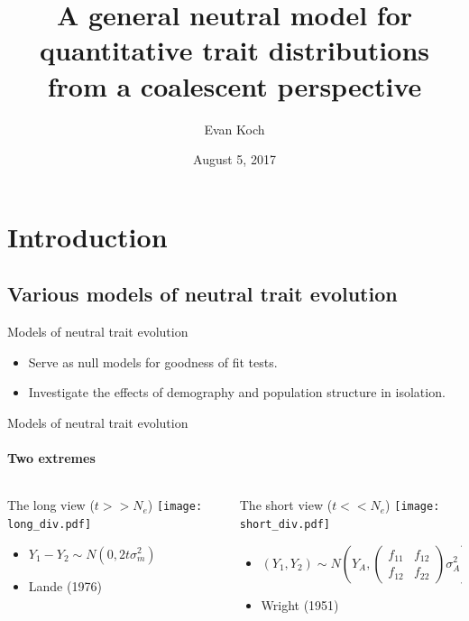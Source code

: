 \documentclass{beamer}
\title[quant gen coal]{A general neutral model for quantitative trait
  distributions from a coalescent perspective}
\author{Evan Koch}
\date{August 5, 2017}
\begin{document}
\frame{\titlepage}
\frame{\tableofcontents}

\section{Introduction}

\subsection{Various models of neutral trait evolution}

\begin{frame}{Models of neutral trait evolution}
  \begin{itemize}
  \item Serve as null models for goodness of fit tests.
  \item Investigate the effects of demography and population structure in
    isolation.
  \end{itemize}
\end{frame}

\begin{frame}{Models of neutral trait evolution}
  \framesubtitle{Two extremes}
  \begin{columns}
    \begin{column}{0.48\columnwidth}
      \begin{block}{The long view ($t>>N_e$)}
        \texttt{[image: long\_div.pdf]}
        \begin{itemize}
        \item {\footnotesize$Y_1 - Y_2 \sim N(0,2 t \sigma_m^2)$}
        \item Lande (1976)
        \end{itemize}
      \end{block}
    \end{column}
    \begin{column}{0.48\columnwidth}
      \begin{block}{The short view ($t<<N_e$)}
        \texttt{[image: short\_div.pdf]}
        \begin{itemize}
        \item {\footnotesize$(Y_1,Y_2) \sim N(Y_A,
          \begin{pmatrix}
            f_{11} & f_{12}\\
            f_{12} & f_{22}
          \end{pmatrix}\sigma_A^2)$}
        \item Wright (1951)
        \end{itemize}
      \end{block}
    \end{column}
  \end{columns}  
\end{frame}
\end{document}
